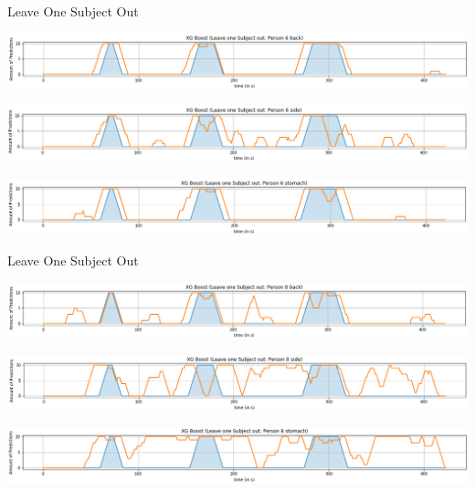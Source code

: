 \documentclass[18pt]{beamer}
\begin{document}
\begin{frame} {Leave One Subject Out}
    \begin{center}
        \includegraphics[scale=0.29]{images/evaluation/loso_10sec/xg_boost_loso/XGBoost(LeaveOneSubjectOutPerson6Back).png}
    \end{center}
    \begin{center}
        \includegraphics[scale=0.29]{images/evaluation/loso_10sec/xg_boost_loso/XGBoost(LeaveOneSubjectOutPerson6Side).png}
    \end{center}
    \begin{center}
        \includegraphics[scale=0.29]{images/evaluation/loso_10sec/xg_boost_loso/XGBoost(LeaveOneSubjectOutPerson6Stomach).png}
    \end{center}
\end{frame}

\begin{frame} {Leave One Subject Out}
    \begin{center}
        \includegraphics[scale=0.29]{images/evaluation/loso_10sec/xg_boost_loso/XGBoost(LeaveOneSubjectOutPerson8Back).png}
    \end{center}
    \begin{center}
        \includegraphics[scale=0.29]{images/evaluation/loso_10sec/xg_boost_loso/XGBoost(LeaveOneSubjectOutPerson8Side).png}
    \end{center}
    \begin{center}
        \includegraphics[scale=0.29]{images/evaluation/loso_10sec/xg_boost_loso/XGBoost(LeaveOneSubjectOutPerson8Stomach).png}
    \end{center}
\end{frame}
\end{document}
